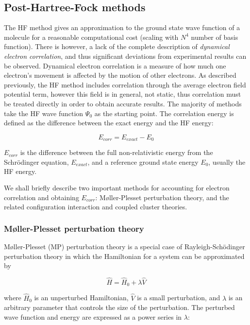 \begin{doublespace}
\subsection{Post-Hartree-Fock methods}

The HF method gives an approximation to the ground state wave function of a
molecule for a reasonable computational cost (scaling with $N^4$ number of basis
function). There is however, a lack of the complete description of
\emph{dynamical electron correlation},\cite{Cramer2004} and thus significant
deviations from experimental results can be observed. Dynamical electron
correlation is a measure of how much one electron's movement is affected by the
motion of other electrons. As described previously, the HF method includes
correlation through the average electron field potential term, however this
field is in general, not static, thus correlation must be treated directly in
order to obtain accurate results. The majority of methods take the HF wave
function $\Psi_0$ as the starting point. The correlation energy is defined as
the difference between the exact energy and the HF energy:

\begin{equation}
  E_{corr} = E_{exact} - E_0
\end{equation}

\noindent $E_{corr}$ is the difference between the full non-relativistic energy
from the Schr{\"o}dinger equation, $E_{exact}$, and a reference ground state
energy $E_0$, usually the HF energy.

We shall briefly describe two important methods for accounting for electron
correlation and obtaining $E_{corr}$: M{\o}ller-Plesset perturbation theory,
and the related configuration interaction and coupled cluster theories.

\subsubsection{M{\o}ller-Plesset perturbation theory}

M{\o}ller-Plesset (MP) perturbation theory is a special case of
Rayleigh-Sch{\"o}dinger perturbation theory in which the Hamiltonian for a
system can be approximated by

\begin{equation}
  \hat{H} = \hat{H}_0 + \lambda\hat{V}
\end{equation}

\noindent where $\hat{H}_0$ is an unperturbed Hamiltonian, $\hat{V}$ is a small
perturbation, and $\lambda$ is an arbitrary parameter that controls the size
of the perturbation. The perturbed wave function and energy are expressed as a
power series in $\lambda$:


\end{doublespace}

